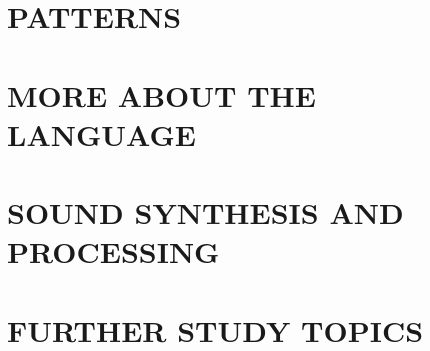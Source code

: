 \documentclass[11pt]{article}
\begin{document}
\part{PATTERNS}



\newpage
\part{MORE ABOUT THE LANGUAGE}








\newpage
\part{SOUND SYNTHESIS AND PROCESSING}



















\newpage
\part{FURTHER STUDY TOPICS}





\newpage
\theendnotes

\end{document}
